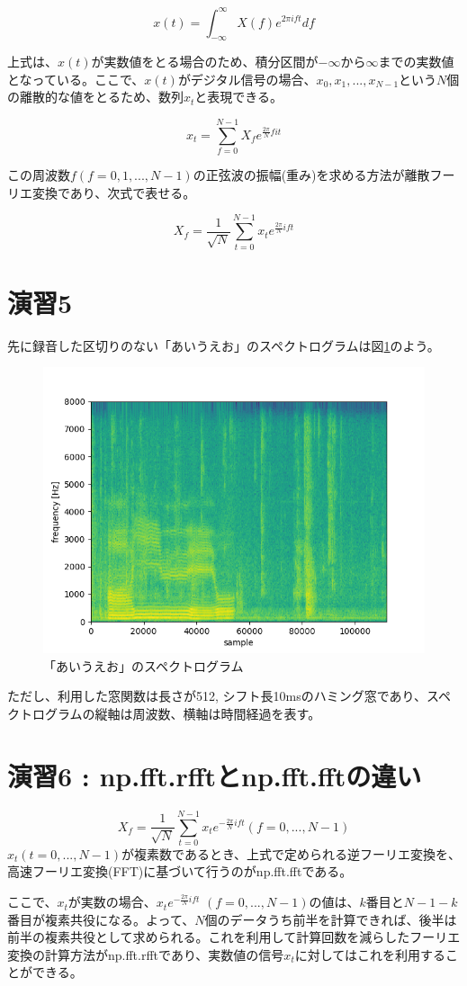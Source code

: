 \documentclass[a4paper,11pt]{jsarticle}
\begin{document}
$$ x(t) = \int_{-\infty}^{\infty} X(f)e^{2\pi ift} df $$

上式は、$x(t)$が実数値をとる場合のため、積分区間が$-\infty$から$\infty$までの実数値となっている。ここで、$x(t)$がデジタル信号の場合、$x_0, x_1, ..., x_{N-1}$という$N$個の離散的な値をとるため、数列$x_t$と表現できる。

$$ x_t = \sum_{f=0}^{N-1} X_f e^{\frac{2\pi}{N}fit} $$

この周波数$f (f=0,1,...,N-1)$の正弦波の振幅(重み)を求める方法が離散フーリエ変換であり、次式で表せる。

$$ X_f = \frac{1}{\sqrt{N}} \sum_{t=0}^{N-1} x_t e^{\frac{2\pi}{N}ift} $$

\section{演習5}
先に録音した区切りのない「あいうえお」のスペクトログラムは図\ref{aiueo_spectrogram}のよう。

\begin{figure}[H]
  \centering
  \includegraphics[scale=0.5]{../ex05/plot-spectrogram.png}
  \caption{「あいうえお」のスペクトログラム}
  \label{aiueo_spectrogram}
\end{figure}

ただし、利用した窓関数は長さが512, シフト長10msのハミング窓であり、スペクトログラムの縦軸は周波数、横軸は時間経過を表す。

\section{演習6 : np.fft.rfftとnp.fft.fftの違い}
$$
X_f = \frac{1}{\sqrt{N}} \sum_{t=0}^{N-1} x_t e^{-\frac{2\pi}{N}ift}  (f=0,...,N-1)
$$
$x_t (t=0,...,N-1)$が複素数であるとき、上式で定められる逆フーリエ変換を、高速フーリエ変換(FFT)に基づいて行うのがnp.fft.fftである。\par
ここで、$x_t$が実数の場合、$x_t e^{-\frac{2\pi}{N}ift}$ $(f=0,...,N-1)$の値は、$k$番目と$N-1-k$番目が複素共役になる。よって、$N$個のデータうち前半を計算できれば、後半は前半の複素共役として求められる。これを利用して計算回数を減らしたフーリエ変換の計算方法がnp.fft.rfftであり、実数値の信号$x_t$に対してはこれを利用することができる。
\end{document}
